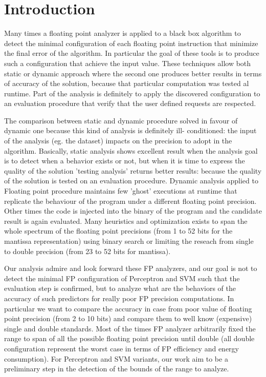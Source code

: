 \documentclass[sigplan,review,anonymous=false]{acmart}\settopmatter{printfolios=true,printccs=false,printacmref=false}
\begin{document}
\section{Introduction}
Many times a floating point analyzer is applied to a black box algorithm to detect the minimal configuration of each floating point instruction that minimize the final error of the algorithm. In particular the goal of these tools is to produce such a configuration that achieve the input value. These techniques allow both static or dynamic approach where the second one produces better results in terms of accuracy of the solution, because that particular computation was tested al runtime. Part of the analysis is definitely to apply the discovered configuration to an evaluation procedure that verify that the user defined requests are respected.

The comparison between static and dynamic procedure solved in favour of dynamic one because this kind of analysis is definitely ill- conditioned: the input of the analysis (eg. the dataset) impacts on the precision to adopt in the algorithm. Basically, static analysis shows excellent result when the analysis goal is to detect when a behavior exists or not, but when it is time to express the quality of the solution 'testing analysis' returns better results: because the quality of the solution is tested on an evaluation procedure. Dynamic analysis applied to Floating point procedure maintains few 'ghost' executions at runtime that replicate the behaviour of the program under a different floating point precision. Other times the code is injected into the binary of the program and the candidate result is again evaluated. Many heuristics and optimization exists to span the whole spectrum of the floating point precisions (from 1 to 52 bits for the mantissa representation) using binary search or limiting the reseach from single to double precision (from 23 to 52 bits for mantissa).

Our analysis admire and look forward these FP analyzers, and our goal is not to detect the minimal FP configuration of Perceptron and SVM such that the evaluation step is confirmed, but to analyze what are the behaviors of the accuracy of such predictors for really poor FP precision computations. In particular we want to compare the accuracy in case from poor value of floating point precision (from 2 to 10 bits) and compare them to well know (expensive) single and double standards. Most of the times FP analyzer arbitrarily fixed the range to span of all the possible floating point precision until double (all double configuration represent the worst case in terms of FP efficiency and energy consumption). For Perceptron and SVM variants, our work aim to be a preliminary step in the detection of the bounds of the range to analyze.
\end{document}
